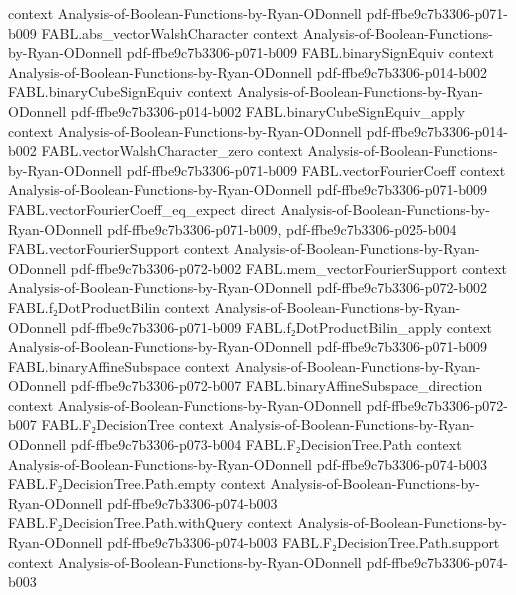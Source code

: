 \begin{theorem}
  {context}
  {Analysis-of-Boolean-Functions-by-Ryan-ODonnell}
  {pdf-ffbe9c7b3306-p071-b009}
\proofstep
  {FABL.abs_vectorWalshCharacter}
  {context}
  {Analysis-of-Boolean-Functions-by-Ryan-ODonnell}
  {pdf-ffbe9c7b3306-p071-b009}
\proofstep
  {FABL.binarySignEquiv}
  {context}
  {Analysis-of-Boolean-Functions-by-Ryan-ODonnell}
  {pdf-ffbe9c7b3306-p014-b002}
\proofstep
  {FABL.binaryCubeSignEquiv}
  {context}
  {Analysis-of-Boolean-Functions-by-Ryan-ODonnell}
  {pdf-ffbe9c7b3306-p014-b002}
\proofstep
  {FABL.binaryCubeSignEquiv_apply}
  {context}
  {Analysis-of-Boolean-Functions-by-Ryan-ODonnell}
  {pdf-ffbe9c7b3306-p014-b002}
\proofstep
  {FABL.vectorWalshCharacter_zero}
  {context}
  {Analysis-of-Boolean-Functions-by-Ryan-ODonnell}
  {pdf-ffbe9c7b3306-p071-b009}
\proofstep
  {FABL.vectorFourierCoeff}
  {context}
  {Analysis-of-Boolean-Functions-by-Ryan-ODonnell}
  {pdf-ffbe9c7b3306-p071-b009}
\proofstep
  {FABL.vectorFourierCoeff_eq_expect}
  {direct}
  {Analysis-of-Boolean-Functions-by-Ryan-ODonnell}
  {pdf-ffbe9c7b3306-p071-b009,
    pdf-ffbe9c7b3306-p025-b004}
\proofstep
  {FABL.vectorFourierSupport}
  {context}
  {Analysis-of-Boolean-Functions-by-Ryan-ODonnell}
  {pdf-ffbe9c7b3306-p072-b002}
\proofstep
  {FABL.mem_vectorFourierSupport}
  {context}
  {Analysis-of-Boolean-Functions-by-Ryan-ODonnell}
  {pdf-ffbe9c7b3306-p072-b002}
\proofstep
  {FABL.f₂DotProductBilin}
  {context}
  {Analysis-of-Boolean-Functions-by-Ryan-ODonnell}
  {pdf-ffbe9c7b3306-p071-b009}
\proofstep
  {FABL.f₂DotProductBilin_apply}
  {context}
  {Analysis-of-Boolean-Functions-by-Ryan-ODonnell}
  {pdf-ffbe9c7b3306-p071-b009}
\proofstep
  {FABL.binaryAffineSubspace}
  {context}
  {Analysis-of-Boolean-Functions-by-Ryan-ODonnell}
  {pdf-ffbe9c7b3306-p072-b007}
\proofstep
  {FABL.binaryAffineSubspace_direction}
  {context}
  {Analysis-of-Boolean-Functions-by-Ryan-ODonnell}
  {pdf-ffbe9c7b3306-p072-b007}
\proofstep
  {FABL.F₂DecisionTree}
  {context}
  {Analysis-of-Boolean-Functions-by-Ryan-ODonnell}
  {pdf-ffbe9c7b3306-p073-b004}
\proofstep
  {FABL.F₂DecisionTree.Path}
  {context}
  {Analysis-of-Boolean-Functions-by-Ryan-ODonnell}
  {pdf-ffbe9c7b3306-p074-b003}
\proofstep
  {FABL.F₂DecisionTree.Path.empty}
  {context}
  {Analysis-of-Boolean-Functions-by-Ryan-ODonnell}
  {pdf-ffbe9c7b3306-p074-b003}
\proofstep
  {FABL.F₂DecisionTree.Path.withQuery}
  {context}
  {Analysis-of-Boolean-Functions-by-Ryan-ODonnell}
  {pdf-ffbe9c7b3306-p074-b003}
\proofstep
  {FABL.F₂DecisionTree.Path.support}
  {context}
  {Analysis-of-Boolean-Functions-by-Ryan-ODonnell}
  {pdf-ffbe9c7b3306-p074-b003}
\proofstep

\end{theorem}
